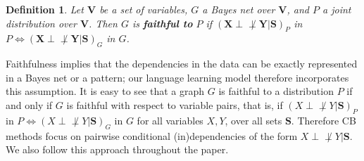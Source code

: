 \documentclass{elsarticle}%
\newtheorem{definition}[theorem]{Definition}
\newcommand{\dep}{\ensuremath{{\perp{}\!\!\!\!\!\!\!\not  \perp{}}}}
\renewcommand{\S}{\mathbf{{S}}}
\begin{document}
\begin{definition}
Let $\mathbf{V}$ be a set of variables, $G$ a Bayes net over
$\mathbf{V}$, and $P$ a joint distribution over $\mathbf{V}$. Then $G$ is \textbf{faithful to} $P$
if $(\mathbf{X}
\dep
\mathbf{Y}|\mathbf{S})_{P}$ in $P
\iff(\mathbf{X}
\dep
 \mathbf{Y}|\mathbf{S})_{G}$ in $G$.
\end{definition}
Faithfulness implies that the dependencies in the data can be exactly represented in a Bayes net or a pattern; our language learning model therefore incorporates this assumption.
It is easy to see that a graph $G$ is faithful to a distribution $P$ if and only if $G$ is faithful
with respect to
variable pairs, that is, if $( X
\dep
 Y| \mathbf{S})_{P}$ in $P
\iff( X
\dep
Y| \mathbf{S})_{G}$ in $G$
for all variables $X, Y$, over all sets $\S$.
Therefore CB methods focus on pairwise conditional
(in)dependencies of the form $X
\dep
Y| \mathbf{S}$. We also 
follow this approach throughout
the paper.
\end{document}
